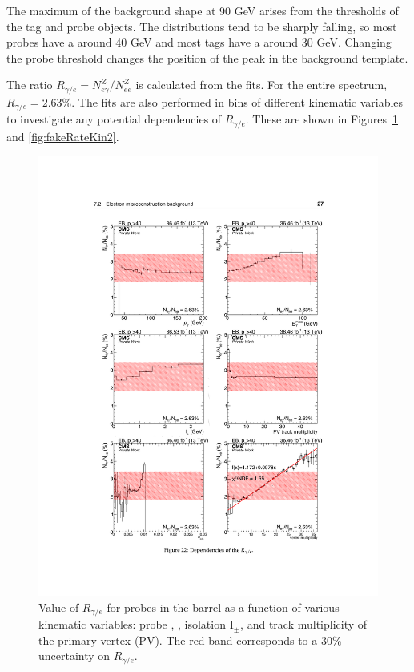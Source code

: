 The maximum of the background shape at 90 GeV arises from the \pT thresholds of the tag and probe objects. The \pT distributions tend to be sharply falling, so most probes have a \pT around 40 GeV and most tags have a \pT around 30 GeV. Changing the probe \pT threshold changes the position of the peak in the background template.

The ratio $R_{\gamma/e} = N_{e\gamma}^Z/N_{ee}^Z$ is calculated from the fits. For the entire spectrum, $R_{\gamma/e} = 2.63\%$. The fits are also performed in bins of different kinematic variables to investigate any potential dependencies of $R_{\gamma/e}$. These are shown in Figures~\ref{fig:fakeRateKin1} and \ref{fig:fakeRateKin2}. 

\begin{figure}[h]
\begin{center}
\includegraphics[width=\textwidth]{Figures/DataAnalysis/fakeKin1.pdf}
\end{center}
\caption{Value of $R_{\gamma/e}$ for probes in the barrel as a function of various kinematic variables: probe \pT, \ETmiss, isolation I$_{\pm}$, 
and track multiplicity of the primary vertex (PV). The red band corresponds to a 30\% uncertainty 
on $R_{\gamma/e}$.
}
\label{fig:fakeRateKin1}
\end{figure}

